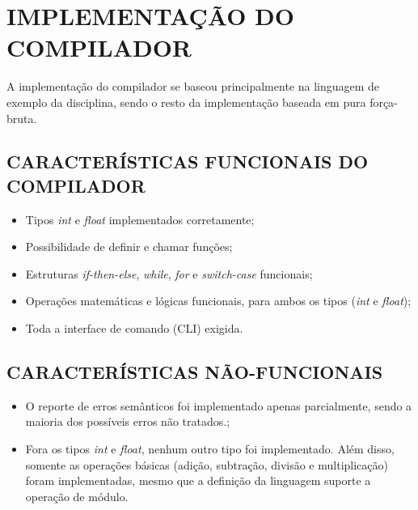 \section{\normalsize IMPLEMENTAÇÃO DO COMPILADOR}
	A implementação do compilador se baseou principalmente na linguagem de exemplo da disciplina, sendo o resto da implementação baseada em pura força-bruta.
	
	\subsection{\normalsize CARACTERÍSTICAS FUNCIONAIS DO COMPILADOR}
	\begin{itemize}
		\item Tipos \textit{int} e \textit{float} implementados corretamente;
		\item Possibilidade de definir e chamar funções;
		\item Estruturas \textit{if-then-else}, \textit{while}, \textit{for} e \textit{switch-case} funcionais;
		\item Operações matemáticas e lógicas funcionais, para ambos os tipos (\textit{int} e \textit{float});
		\item Toda a interface de comando (CLI) exigida.
		
	\end{itemize}
	
	\subsection{\normalsize CARACTERÍSTICAS NÃO-FUNCIONAIS}
	\begin{itemize}
		\item O reporte de erros semânticos foi implementado apenas parcialmente, sendo a maioria dos possíveis erros não tratados.;
		\item Fora os tipos \textit{int} e \textit{float}, nenhum outro tipo foi implementado. Além disso, somente as operações básicas (adição, subtração, divisão e multiplicação) foram implementadas, mesmo que a definição da linguagem suporte a operação de módulo.
	\end{itemize}
	

